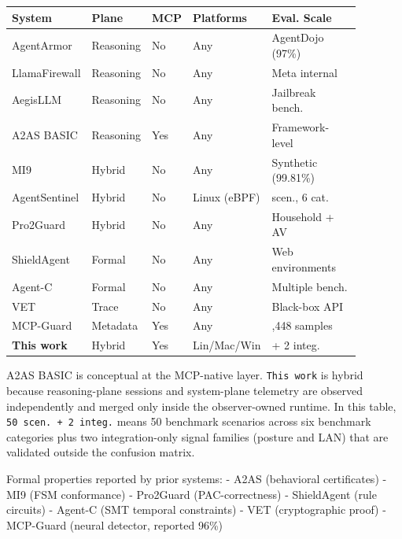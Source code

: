 \documentclass[
]{article}
\begin{document}
\begingroup\small
\begin{center}
\setlength{\tabcolsep}{2pt}
\renewcommand{\arraystretch}{1.04}
\begin{tabular}{@{}>{\raggedright\arraybackslash}p{0.17\linewidth}>{\raggedright\arraybackslash}p{0.14\linewidth}>{\raggedright\arraybackslash}p{0.08\linewidth}>{\raggedright\arraybackslash}p{0.17\linewidth}>{\raggedright\arraybackslash}p{0.32\linewidth}@{}}
\toprule
System & Plane & MCP & Platforms & Eval. Scale \\
\midrule
AgentArmor & Reasoning & No & Any & AgentDojo (97\%) \\
LlamaFirewall & Reasoning & No & Any & Meta internal \\
AegisLLM & Reasoning & No & Any & Jailbreak bench. \\
A2AS BASIC & Reasoning & Yes & Any & Framework-level \\
MI9 & Hybrid & No & Any & Synthetic (99.81\%) \\
AgentSentinel & Hybrid & No & Linux (eBPF) & 60 scen., 6 cat. \\
Pro2Guard & Hybrid & No & Any & Household + AV \\
ShieldAgent & Formal & No & Any & Web environments \\
Agent-C & Formal & No & Any & Multiple bench. \\
VET & Trace & No & Any & Black-box API \\
MCP-Guard & Metadata & Yes & Any & 70,448 samples \\
\textbf{This work} & Hybrid & Yes & Lin/Mac/Win & 50 + 2 integ. \\
\bottomrule
\end{tabular}
\end{center}
\endgroup

\begingroup\footnotesize\noindent A2AS BASIC is conceptual at the
MCP-native layer. \texttt{This work} is hybrid because reasoning-plane
sessions and system-plane telemetry are observed independently and
merged only inside the observer-owned runtime. In this table,
\texttt{50 scen. + 2 integ.} means 50 benchmark scenarios across six
benchmark categories plus two integration-only signal families (posture
and LAN) that are validated outside the confusion matrix.

\par\endgroup

Formal properties reported by prior systems: - A2AS (behavioral
certificates) - MI9 (FSM conformance) - Pro2Guard (PAC-correctness) -
ShieldAgent (rule circuits) - Agent-C (SMT temporal constraints) - VET
(cryptographic proof) - MCP-Guard (neural detector, reported 96\%)
\end{document}
